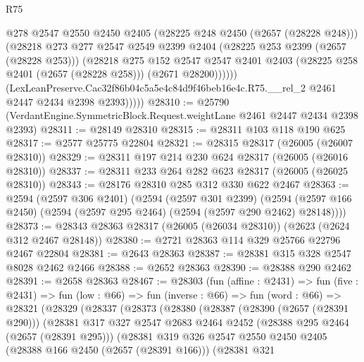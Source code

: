 \begin{lexlean}{R75}
\begin{coremodule}
                  @278
                  @2547
                  @2550
                  @2450
                  @2405
                  (@28225 @248 @2450 (@2657 (@28228 @248)))
                  (@28218
                    @273
                    @277
                    @2547
                    @2549
                    @2399
                    @2404
                    (@28225 @253 @2399 (@2657 (@28228 @253)))
                    (@28218
                      @275
                      @152
                      @2547
                      @2547
                      @2401
                      @2403
                      (@28225 @258 @2401 (@2657 (@28228 @258)))
                      (@2671 @28200))))))
            (LexLeanPreserve.Cac32f86b04c5a5e4c84d9f46beb16e4c.R75.__rel_2
              @2461
              @2447
              @2434
              @2398
              @2393)))))
@28310 := @25790 (VerdantEngine.SymmetricBlock.Request.weightLane @2461 @2447 @2434 @2398 @2393)
@28311 := @28149 @28310
@28315 := @28311 @103 @118 @190 @625
@28317 := @2577 @25775 @22804
@28321 := @28315 @28317 (@26005 (@26007 @28310))
@28329 := @28311 @197 @214 @230 @624 @28317 (@26005 (@26016 @28310))
@28337 := @28311 @233 @264 @282 @623 @28317 (@26005 (@26025 @28310))
@28343 := @28176 @28310 @285 @312 @330 @622 @2467
@28363 := @2594
    (@2597 @306 @2401)
    (@2594
      (@2597 @301 @2399)
      (@2594 (@2597 @166 @2450) (@2594 (@2597 @295 @2464) (@2594 (@2597 @290 @2462) @28148))))
@28373 := @28343 @28363 @28317 (@26005 (@26034 @28310)) (@2623 (@2624 @312 @2467 @28148))
@28380 := @2721 @28363 @114 @329 @25766 @22796 @2467 @22804
@28381 := @2643 @28363
@28387 := @28381 @315 @328 @2547 @8028 @2462 @2466
@28388 := @2652 @28363
@28390 := @28388 @290 @2462
@28391 := @2658 @28363
@28467 := @28303
    (fun (affine : @2431) =>
    fun (five : @2431) =>
    fun (low : @66) =>
    fun (inverse : @66) =>
    fun (word : @66) =>
    @28321
      (@28329
        (@28337
          (@28373
            (@28380
              (@28387
                (@28390 (@2657 (@28391 @290)))
                (@28381
                  @317
                  @327
                  @2547
                  @2683
                  @2464
                  @2452
                  (@28388 @295 @2464 (@2657 (@28391 @295)))
                  (@28381
                    @319
                    @326
                    @2547
                    @2550
                    @2450
                    @2405
                    (@28388 @166 @2450 (@2657 (@28391 @166)))
                    (@28381
                      @321

\end{coremodule}
\end{lexlean}
